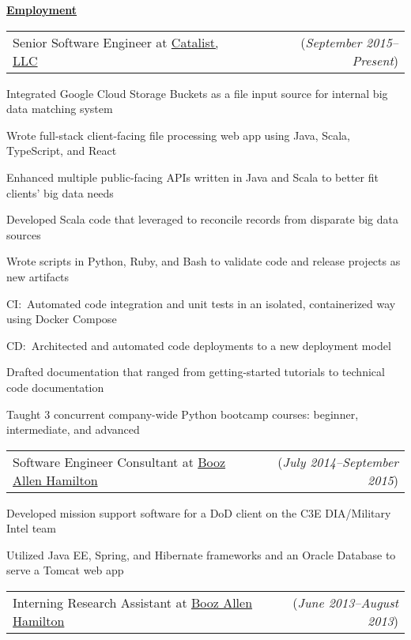 \documentclass[11pt, letterpaper]{letter}
\makeatletter
\newlength{\indwidth}            \setlength{\indwidth}{\textwidth-.4in}
\newlength{\headerAntispace}     \setlength{\headerAntispace}{-6pt}
\newcommand{\dated}[2]{
    \begin{tabular*}{\indwidth}{l@{\extracolsep{\fill}}r}
        #1 & (\textit{#2})
    \end{tabular*}
}
\newcommand{\myul}[3]{
    \begingroup
        \renewcommand{\ULdepth}{#1}
        \renewcommand{\ULthickness}{#2}
        \uline{#3}
    \endgroup
}
\newcommand{\sectionheader}[1]{
    \myul{2.7pt}{0.5pt}{\large \textbf{#1}}
}
\newcommand{\CatalistLLC}{\href{https://catalist.us/}{Catalist, LLC}}
\newcommand{\BAH}{\href{https://www.boozallen.com/}{Booz Allen Hamilton}}
\makeatother
\begin{document}
\sectionheader{Employment}
\vspace{\headerAntispace}
\begin{compactitem}
    \item \dated{Senior Software Engineer at \CatalistLLC}{September 2015--Present}
        \begin{compactitem}
            \item Integrated Google Cloud Storage Buckets as a file input source for internal big data matching system
            \item Wrote full-stack client-facing file processing web app using Java, Scala, TypeScript, and React
            \item Enhanced multiple public-facing APIs written in Java and Scala to better fit clients' big data needs
            \item Developed Scala code that leveraged \Elasticsearch{} to reconcile records from disparate big data
                sources
            \item Wrote scripts in Python, Ruby, and Bash to validate code and release projects as new artifacts
            \item CI:\ Automated code integration and unit tests in an isolated, containerized way using Docker Compose
            \item CD:\ Architected and automated code deployments to a new \BlueGreen{} deployment model
            \item Drafted documentation that ranged from getting-started tutorials to technical code documentation
            \item Taught 3 concurrent company-wide Python bootcamp courses: beginner, intermediate, and advanced
        \end{compactitem}
    \item \dated{Software Engineer Consultant at \BAH}{July 2014--September 2015}
        \begin{compactitem}
            \item Developed mission support software for a DoD client on the C3E DIA/Military Intel team
            \item Utilized Java EE, Spring, and Hibernate frameworks and an Oracle Database to serve a Tomcat web app
        \end{compactitem}
    \item \dated{Interning Research Assistant at \BAH}{June 2013--August 2013}

\end{compactitem}
\end{document}
